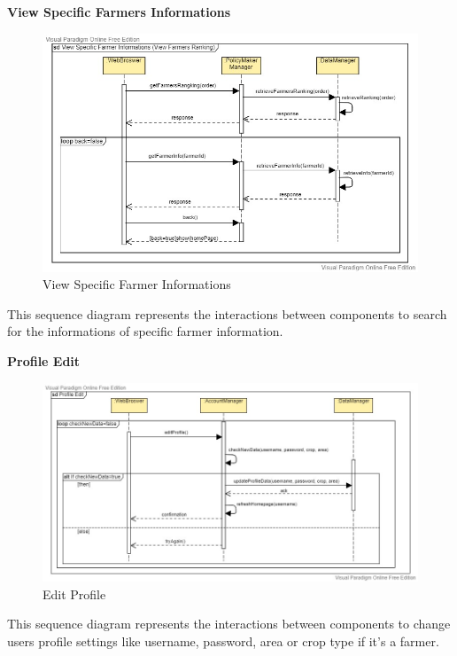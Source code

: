 \documentclass[table, 12pt]{article}
\begin{document}
\newpage
\textbf{View Specific Farmers Informations}
\begin{center}
    \begin{figure}[H]
        \includegraphics[scale=0.6, center]{assets/SequenceDiagram/SpecificFarmerInfo.jpg}
        \caption{View Specific Farmer Informations}
        \label{fig: specificFarmerInfo}
    \end{figure}
\end{center}
This sequence diagram represents the interactions between components to search for the informations of specific farmer information.

\newpage
\textbf{Profile Edit}
\begin{center}
    \begin{figure}[H]
        \includegraphics[scale=0.6, center]{assets/SequenceDiagram/ProfileEdit.jpg}
        \caption{Edit Profile}
        \label{fig: profileEdit}
    \end{figure}
\end{center}
This sequence diagram represents the interactions between components to change users profile settings like username, password, area or crop type if it's a farmer.
\end{document}
